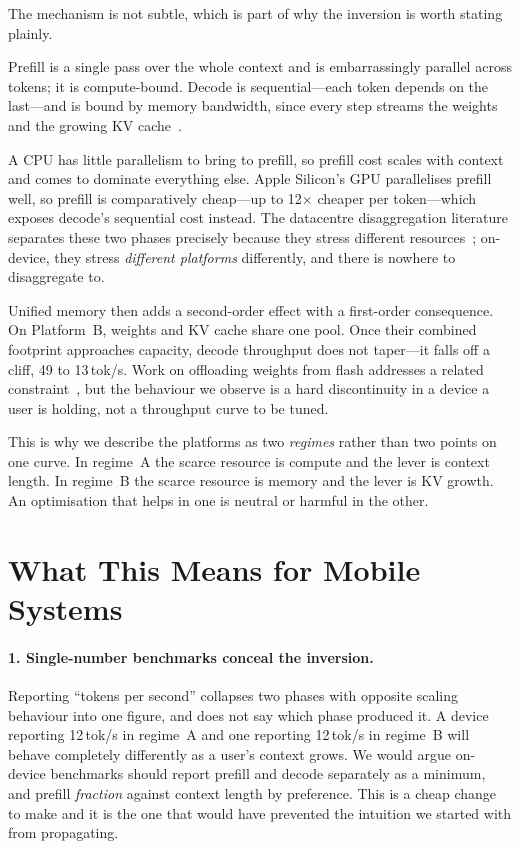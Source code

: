 \documentclass[sigconf,nonacm,10pt]{acmart}
\begin{document}
The mechanism is not subtle, which is part of why the inversion is worth stating plainly.

Prefill is a single pass over the whole context and is embarrassingly parallel across tokens; it is
compute-bound. Decode is sequential---each token depends on the last---and is bound by memory bandwidth, since
every step streams the weights and the growing KV cache~\cite{kwon2023pagedattention,agrawal2024sarathi}.

A CPU has little parallelism to bring to prefill, so prefill cost scales with context and comes to dominate
everything else. Apple Silicon's GPU parallelises prefill well, so prefill is comparatively cheap---up to
12$\times$ cheaper per token---which exposes decode's sequential cost instead. The datacentre disaggregation
literature separates these two phases precisely because they stress different
resources~\cite{patel2024splitwise,zhong2024distserve}; on-device, they stress \emph{different platforms}
differently, and there is nowhere to disaggregate to.

Unified memory then adds a second-order effect with a first-order consequence. On Platform~B, weights and KV
cache share one pool. Once their combined footprint approaches capacity, decode throughput does not taper---it
falls off a cliff, 49 to 13\,tok/s. Work on offloading weights from flash addresses a related
constraint~\cite{alizadeh2024llmflash}, but the behaviour we observe is a hard discontinuity in a device a user
is holding, not a throughput curve to be tuned.

This is why we describe the platforms as two \emph{regimes} rather than two points on one curve. In regime~A the
scarce resource is compute and the lever is context length. In regime~B the scarce resource is memory and the
lever is KV growth. An optimisation that helps in one is neutral or harmful in the other.

\section{What This Means for Mobile Systems}
\label{sec:implications}

\paragraph{1. Single-number benchmarks conceal the inversion.}
Reporting ``tokens per second'' collapses two phases with opposite scaling behaviour into one figure, and does
not say which phase produced it. A device reporting 12\,tok/s in regime~A and one reporting 12\,tok/s in
regime~B will behave completely differently as a user's context grows. We would argue on-device benchmarks
should report prefill and decode separately as a minimum, and prefill \emph{fraction} against context length by
preference. This is a cheap change to make and it is the one that would have prevented the intuition we started
with from propagating.
\end{document}
